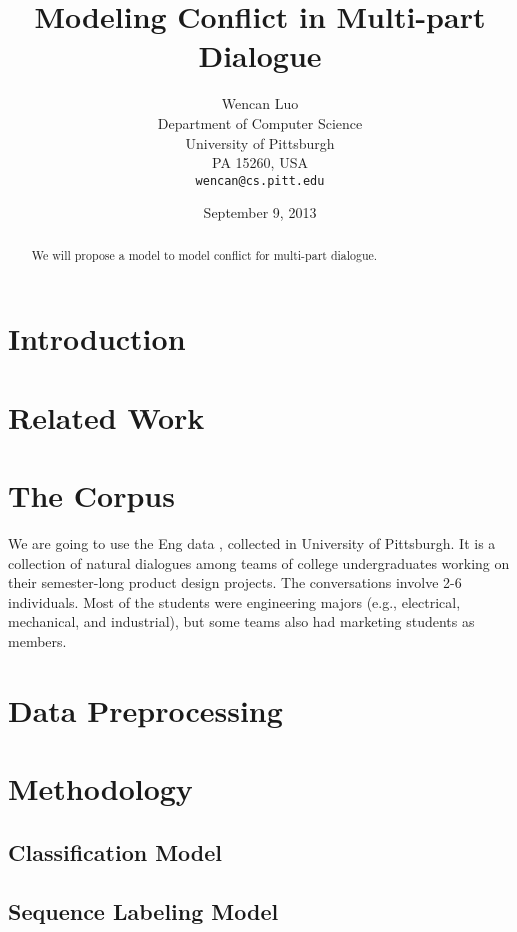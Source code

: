\documentclass[11pt,letterpaper]{article}
\title{Modeling Conflict in Multi-part Dialogue}
\author{Wencan Luo\\
	    Department of Computer Science\\
	    University of Pittsburgh\\
	    PA 15260, USA\\
	    {\tt wencan@cs.pitt.edu}
	  }
\date{September 9, 2013}
\begin{document}
\maketitle
\begin{abstract}
We will propose a model to model conflict for multi-part dialogue.

\end{abstract}

\section{Introduction}

\section{Related Work}

\section{The Corpus}

We are going to use the Eng data \cite{Jang:2012,Friedberg:2012}, collected in University of Pittsburgh.
It is a collection of natural dialogues among teams of college undergraduates working on their semester-long product design projects.
The conversations involve 2-6 individuals. Most of the students were engineering majors (e.g., electrical, mechanical, and industrial), but some teams also had marketing students as members.


\section{Data Preprocessing}

\section{Methodology}

\subsection{Classification Model}
\begin{itemize}

\end{itemize}

\subsection{Sequence Labeling Model}
\end{document}
